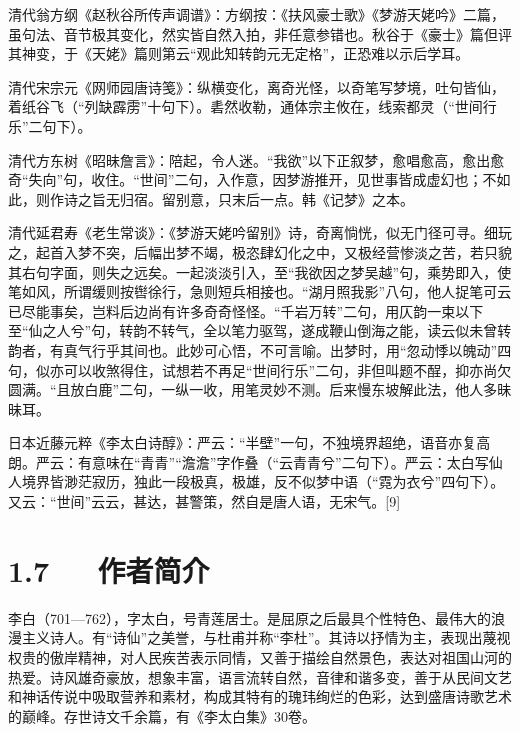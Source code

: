 \documentclass[letterpaper,10pt,english]{sphinxmanual}
\begin{document}
清代翁方纲《赵秋谷所传声调谱》：方纲按：《扶风豪士歌》《梦游天姥吟》二篇，虽句法、音节极其变化，然实皆自然入拍，非任意参错也。秋谷于《豪士》篇但评其神变，于《天姥》篇则第云“观此知转韵元无定格”，正恐难以示后学耳。

清代宋宗元《网师园唐诗笺》：纵横变化，离奇光怪，以奇笔写梦境，吐句皆仙，着纸谷飞（“列缺霹雳”十句下）。砉然收勒，通体宗主攸在，线索都灵（“世间行乐”二句下）。

清代方东树《昭昧詹言》：陪起，令人迷。“我欲”以下正叙梦，愈唱愈高，愈出愈奇“失向”句，收住。“世间”二句，入作意，因梦游推开，见世事皆成虚幻也；不如此，则作诗之旨无归宿。留别意，只末后一点。韩《记梦》之本。

清代延君寿《老生常谈》：《梦游天姥吟留别》诗，奇离惝恍，似无门径可寻。细玩之，起首入梦不突，后幅出梦不竭，极恣肆幻化之中，又极经营惨淡之苦，若只貌其右句字面，则失之远矣。一起淡淡引入，至“我欲因之梦吴越”句，乘势即入，使笔如风，所谓缓则按辔徐行，急则短兵相接也。“湖月照我影”八句，他人捉笔可云已尽能事矣，岂料后边尚有许多奇奇怪怪。“千岩万转”二句，用仄韵一束以下至“仙之人兮”句，转韵不转气，全以笔力驱驾，遂成鞭山倒海之能，读云似未曾转韵者，有真气行乎其间也。此妙可心悟，不可言喻。出梦时，用“忽动悸以魄动”四句，似亦可以收煞得住，试想若不再足“世间行乐”二句，非但叫题不酲，抑亦尚欠圆满。“且放白鹿”二句，一纵一收，用笔灵妙不测。后来慢东坡解此法，他人多昧昧耳。

日本近藤元粹《李太白诗醇》：严云：“半壁”一句，不独境界超绝，语音亦复高朗。严云：有意味在“青青”“澹澹”字作叠（“云青青兮”二句下）。严云：太白写仙人境界皆渺茫寂历，独此一段极真，极雄，反不似梦中语（“霓为衣兮”四句下）。又云：“世间”云云，甚达，甚警策，然自是唐人语，无宋气。{[}9{]}


\section{1.7   作者简介}
\label{\detokenize{p01_u6563_u6587/_u674e_u767d-_u68a6_u6e38_u5929_u59e5_u541f_u7559_u522b:id9}}
李白（701—762），字太白，号青莲居士。是屈原之后最具个性特色、最伟大的浪漫主义诗人。有“诗仙”之美誉，与杜甫并称“李杜”。其诗以抒情为主，表现出蔑视权贵的傲岸精神，对人民疾苦表示同情，又善于描绘自然景色，表达对祖国山河的热爱。诗风雄奇豪放，想象丰富，语言流转自然，音律和谐多变，善于从民间文艺和神话传说中吸取营养和素材，构成其特有的瑰玮绚烂的色彩，达到盛唐诗歌艺术的巅峰。存世诗文千余篇，有《李太白集》30卷。
\end{document}
